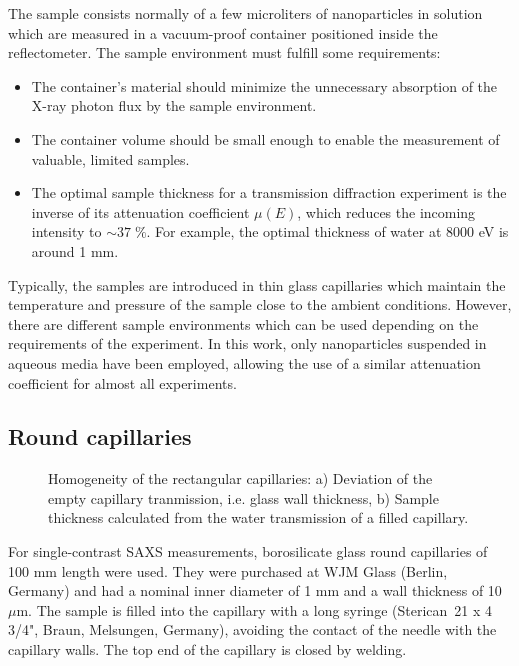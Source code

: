 The sample consists normally of a few microliters of nanoparticles in solution which are measured in a vacuum-proof container positioned inside the reflectometer. The sample environment must fulfill some requirements:

\begin{itemize}
        \item The container's material should minimize the unnecessary absorption of the X-ray photon flux by the sample environment.
        \item The container volume should be small enough to enable the measurement of valuable, limited samples.
        \item The optimal sample thickness for a transmission diffraction experiment is the inverse of its attenuation coefficient $\mu(E)$, which reduces the incoming intensity to $\sim37\;\%$. For example, the optimal thickness of water at 8000 eV is around 1 mm.
\end{itemize}

Typically, the samples are introduced in thin glass capillaries which maintain the temperature and pressure of the sample close to the ambient conditions. However, there are different sample environments which can be used depending on the requirements of the experiment. In this work, only nanoparticles suspended in aqueous media have been employed, allowing the use of a similar attenuation coefficient for almost all experiments.

\subsection{Round capillaries}

\begin{figure}%
	\centering
		\caption[Homogeneity of the rectangular capillaries.]{Homogeneity of the rectangular capillaries: a) Deviation of the empty capillary tranmission, i.e. glass wall thickness, b) Sample thickness calculated from the water transmission of a filled capillary. }
\end{figure}

For single-contrast SAXS measurements, borosilicate glass round capillaries of 100 mm length were used. They were purchased at WJM Glass (Berlin, Germany) and had a nominal inner diameter of 1 mm and a wall thickness of 10 $\mu$m. The sample is filled into the capillary with a long syringe (Sterican\textregistered\ 21 x 4 3/4", Braun, Melsungen, Germany), avoiding the contact of the needle with the capillary walls. The top end of the capillary is closed by welding.

